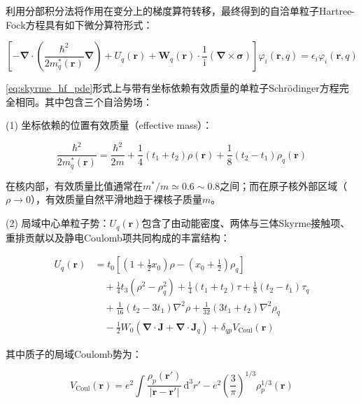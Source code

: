 利用分部积分法将作用在变分上的梯度算符转移，最终得到的自洽单粒子Hartree-Fock方程具有如下微分算符形式：

\begin{equation}
\left[-\boldsymbol{\nabla}\cdot\left(\frac{\hbar^{2}}{2m^{*}_{q}(\boldsymbol{r})}\boldsymbol{\nabla}\right)+U_{q}(\boldsymbol{r})+\boldsymbol{W}_{q}(\boldsymbol{r})\cdot\frac{1}{\mathrm{i}}(\boldsymbol{\nabla}\times\boldsymbol{\sigma})\right]\varphi_{i}(\boldsymbol{r},q)=\epsilon_{i}\varphi_{i}(\boldsymbol{r},q)\label{eq:skyrme_hf_pde}
\end{equation}

\ref{eq:skyrme_hf_pde}形式上与带有坐标依赖有效质量的单粒子Schrödinger方程完全相同。其中包含三个自洽势场：

(1) 坐标依赖的位置有效质量（effective mass）：

\begin{equation}
\frac{\hbar^{2}}{2m^{*}_{q}(\boldsymbol{r})}=\frac{\hbar^{2}}{2m}+\frac{1}{4}\left(t_{1}+t_{2}\right)\rho(\boldsymbol{r})+\frac{1}{8}\left(t_{2}-t_{1}\right)\rho_{q}(\boldsymbol{r})\label{eq:effective_mass_def}
\end{equation}

在核内部，有效质量比值通常在$m^{*}/m\simeq0.6\sim0.8$之间；而在原子核外部区域（$\rho\to0$），有效质量自然平滑地趋于裸核子质量$m$。

(2) 局域中心单粒子势：$U_{q}(\boldsymbol{r})$包含了由动能密度、两体与三体Skyrme接触项、重排贡献以及静电Coulomb项共同构成的丰富结构：

\begin{align}
U_{q}(\boldsymbol{r}) & =t_{0}\left[\left(1+\frac{1}{2}x_{0}\right)\rho-\left(x_{0}+\frac{1}{2}\right)\rho_{q}\right]\nonumber \\
 & \quad+\frac{1}{4}t_{3}\left(\rho^{2}-\rho^{2}_{q}\right)+\frac{1}{4}\left(t_{1}+t_{2}\right)\tau+\frac{1}{8}\left(t_{2}-t_{1}\right)\tau_{q}\nonumber \\
 & \quad+\frac{1}{16}\left(t_{2}-3t_{1}\right)\nabla^{2}\rho+\frac{1}{32}\left(3t_{1}+t_{2}\right)\nabla^{2}\rho_{q}\nonumber \\
 & \quad-\frac{1}{2}W_{0}\left(\boldsymbol{\nabla}\cdot\boldsymbol{J}+\boldsymbol{\nabla}\cdot\boldsymbol{J}_{q}\right)+\delta_{qp}V_{\mathrm{Coul}}(\boldsymbol{r})\label{eq:U_q_center_pot}
\end{align}

其中质子的局域Coulomb势为：

\begin{equation}
V_{\mathrm{Coul}}(\boldsymbol{r})=e^{2}\int\frac{\rho_{p}(\boldsymbol{r}')}{|\boldsymbol{r}-\boldsymbol{r}'|}\,\mathrm{d}^{3}r'-e^{2}\left(\frac{3}{\pi}\right)^{1/3}\rho^{1/3}_{p}(\boldsymbol{r})\label{eq:V_coul_direct_exchange}
\end{equation}

